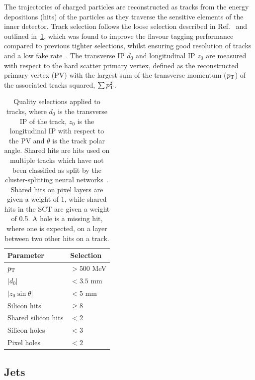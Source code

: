 The trajectories of charged particles are reconstructed as tracks from the energy depositions (hits) of the particles as they traverse the sensitive elements of the inner detector.
Track selection follows the loose selection described in Ref.~\cite{ATL-PHYS-PUB-2020-014} and outlined in~\cref{tab:track_selections}, which was found to improve the flavour tagging performance compared to previous tighter selections, whilst ensuring good resolution of tracks and a low fake rate~\cite{PERF-2015-08}.
The transverse IP $d_0$ and longitudinal IP $z_0$ are measured with respect to the hard scatter primary vertex, defined as the reconstructed primary vertex (PV) with the largest sum of the transverse momentum ($p_{\text{T}}$) of the associated tracks squared, $\sum p_{\text{T}}^2$.

\begin{table}[!htbp]
  \footnotesize\centering
  \setlength{\tabcolsep}{0.5em} %
  \caption{
    Quality selections applied to tracks,
    where $d_0$ is the transverse IP of the track, $z_0$ is the longitudinal IP with respect to the PV and $\theta$ is the track polar angle.
    Shared hits are hits used on multiple tracks which have not been classified as split by the cluster-splitting neural networks~\cite{PERF-2015-08}.
    Shared hits on pixel layers are given a weight of 1, while shared hits in the SCT are given a weight of 0.5.
    A hole is a missing hit, where one is expected, on a layer between two other hits on a track.
    }
  \begin{tabular}{ll}
    \toprule 
    \textbf{Parameter} & \textbf{Selection} \\
    \hline
    $p_{\text{T}}$                & $> 500$ MeV \\
    $|d_0|$              & $< 3.5$ mm \\
    $|z_0 \sin\theta|$   & $< 5$ mm \\
    Silicon hits         & $\ge 8$ \\
    Shared silicon hits  & $< 2$ \\
    Silicon holes        & $< 3$ \\
    Pixel holes          & $< 2$ \\
    \bottomrule
  \end{tabular}
  \vspace{4mm}
  \label{tab:track_selections}
\end{table}


\subsection{Jets}\label{sec:jets}


